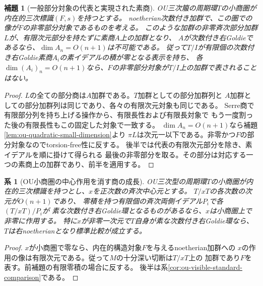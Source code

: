 \documentclass[11pt,a4paper]{ltjsarticle}
\newtheorem{lemma}[theorem]{補題}
\newtheorem{corollary}[theorem]{系}
\theoremstyle{definition}
\begin{document}
\begin{lemma}[一般部分対象の代表と実現された素商]
\label{lem:ou-small-realized-prime}
OU三次箙の周期環$T$の小商圏が内在的三次標識$(F,s)$を持つとする。
noetherian次数付き加群で、この圏での像が$F$の非零部分対象であるものを考える。
このような加群の非零斉次部分加群$L$が、有限次元部分を持たずに素商$A$上の加群となり、
$A$が次数付き右Goldieであるなら、$\dim A_n=O(n+1)$は不可能である。
従って$T/I$が有限個の次数付き右Goldie素商$A_i$の素イデアルの積が零となる表示を持ち、
各$\dim(A_i)_n=O(n+1)$なら、$F$の非零部分対象が$T/I$上の加群で表されることはない。
\end{lemma}
\begin{proof}
$L$の全ての部分商は$A$加群である。$T$加群としての部分加群列と
$A$加群としての部分加群列は同じであり、各々の有限次元対象も同じである。
Serre商で有限部分列を持ち上げる操作から、有限長性および有限長対象で
もう一度割った後の有限長性もこの固定した対象で一致する。
$\dim A_n=O(n+1)$なら補題\ref{lem:ou-quadratic-small-dimension}より
$\pi L$は次元一以下である。非零かつ$F$の部分対象なのでtorsion-free性に反する。
後半では代表の有限次元部分を除き、素イデアルを順に掛けて得られる
最後の非零部分を取る。その部分は対応する一つの素商上の加群であり、前半を適用する。
\end{proof}

\begin{corollary}[OU小商圏の中心作用を消す商の成長]
\label{cor:ou-invisible-centre-growth}
OU三次型の周期環$T$の小商圏が内在的三次標識を持つとし、$x$を正次数の斉次中心元とする。
$T/xT$の各次数の次元が$O(n+1)$であり、
零積を持つ有限個の斉次両側イデアル$P_i$で各$(T/xT)/P_i$が
素な次数付き右Goldie環となるものがあるなら、$x$は小商圏上で非零に作用する。
特に$x$が非零一次元で$T$自身が素な次数付き右Goldie環なら、
$T$は右noetherianとなり標準比較が成立する。
\end{corollary}
\begin{proof}
$x$が小商圏で零なら、内在的構造対象$F$を与えるnoetherian加群への
$x$の作用の像は有限次元である。従って$M$の十分深い切断は$T/xT$上の
加群であり$F$を表す。前補題の有限零積の場合に反する。
後半は系\ref{cor:ou-visible-standard-comparison}である。
\end{proof}
\end{document}
